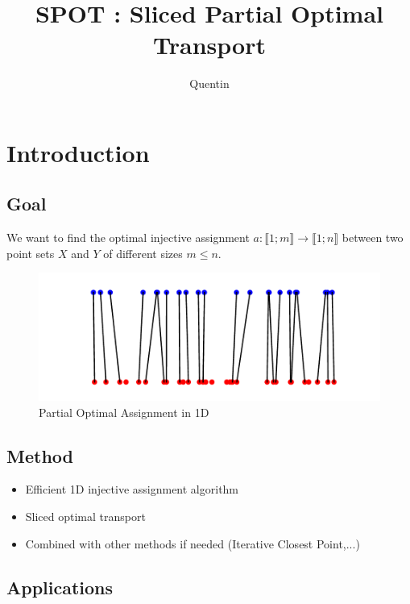 \documentclass[11pt]{beamer}
\title{SPOT : Sliced Partial Optimal Transport}
\author{Quentin \bsc{Spinat}}
\date{}
\begin{document}
\begin{frame}
\titlepage
\end{frame}
	
\section*{Introduction}	

\subsection*{Goal}
	
\begin{frame}
We want to find the optimal injective assignment $a : \llbracket 1;m \rrbracket \rightarrow \llbracket 1;n \rrbracket$ between two point sets $X$ and $Y$ of different sizes $m\leqslant n$.

\begin{figure}[H]
\includegraphics[scale = 0.5]{a_fig.pdf}
\caption{Partial Optimal Assignment in 1D}\label{a_fig}
\end{figure}

\end{frame}

\subsection*{Method}

\begin{frame}

\begin{itemize}
\item Efficient 1D injective assignment algorithm
\item Sliced optimal transport 
\item Combined with other methods if needed (Iterative Closest Point,...)
\end{itemize}

\end{frame}

\subsection*{Applications}
\end{document}
